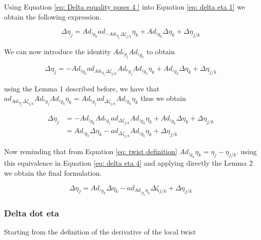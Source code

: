 \documentclass[12pt,a4paper]{book}
\begin{document}
Using Equation \eqref{eq: Delta equality poses 4 } into Equation \eqref{eq: delta eta 1} we obtain the following expression.

\begin{equation}\label{eq: delta eta 2}
	\Delta \eta_j 	= Ad_{^j g_k} ad_{- Ad_{^k g _j}   \Delta \zeta _{j/k}} \eta_k + Ad_{^j g_k} \Delta \eta_k  + \Delta \eta_{j/k}
\end{equation}

We can now introduce the identity $Ad_{^k g _j}Ad_{^j g _k}$ to obtain

\begin{equation}\label{eq: delta eta 3}
	\Delta \eta_j 	= - Ad_{^j g_k} ad_{Ad_{^k g _j}   \Delta \zeta _{j/k}} Ad_{^k g _j}Ad_{^j g _k}  \eta_k + Ad_{^j g_k} \Delta \eta_k  + \Delta \eta_{j/k}
\end{equation}

using the Lemma 1 described before, we have that $ad_{Ad_{^k g _j}   \Delta \zeta _{j/k}} Ad_{^k g _j} Ad_{^j g _k}  \eta_k = Ad_{^k g _j} ad_{\Delta \zeta _{j/k}} Ad_{^j g _k}  \eta_k$ thus we obtain


\begin{equation}\label{eq: delta eta 4}
\begin{aligned}
	\Delta \eta_j 	&= - Ad_{^j g_k} Ad_{^k g _j} ad_{\Delta \zeta _{j/k}} Ad_{^j g _k}  \eta_k + Ad_{^j g_k} \Delta \eta_k  + \Delta \eta_{j/k} \\
					&= Ad_{^j g_k} \Delta \eta_k - ad_{\Delta \zeta _{j/k}} Ad_{^j g _k}  \eta_k +  \Delta \eta_{j/k} 
\end{aligned}
\end{equation}

Now reminding that from Equation \eqref{eq: twist definition} $Ad_{^j g _k}  \eta_k = \eta_j - \eta_{j/k}$. using this equivalence in Equation \eqref{eq: delta eta 4} and applying directly the Lemma 2 we obtain the final formulation.

\begin{equation}\label{eq: delta eta 4}
	\Delta \eta_j 	= Ad_{^j g_k} \Delta \eta_k - ad_{Ad_{^j g _k}  \eta_k} \Delta \zeta _{j/k} +  \Delta \eta_{j/k} 
\end{equation}


\subsubsection{Delta dot eta}

Starting from the definition of the derivative of the local twist 
\end{document}
